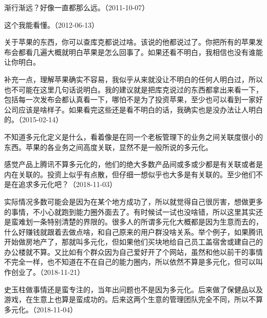 渐行渐远？好像一直都那么远。（2011-10-07）


这个我能看懂。（2012-06-13）


关于苹果的东西，你可以查库克都说过啥。该说的他都说过了。你把所有的苹果发布会都看几遍大概就明白苹果是怎么回事了。如果还看不明白，我相信也没有谁能让你明白。

补充一点，理解苹果确实不容易，我似乎从来就没让不明白的任何人明白过，所以也不可能在这里几句话说明白。我的建议就是把库克说过的东西都拿出来看一下，包括每一次发布会都认真看一下，哪怕不是为了投资苹果，至少也可以看到一家好公司应该是啥样子。如果看完这些还是看不明白的话，我确实也是没办法让人明白的。（2015-02-14）


不知道多元化定义是什么，看着像是在同一个老板管理下的业务之间关联度很小的东西。苹果的各业务之间高度关联，显然不是一般所说的多元化。


感觉产品上腾讯不算多元化的，他们的绝大多数产品间或多或少都是有关联或者是内在关联的。投资上似乎有点散，但仔细一想似乎也大多是有关联的。至少他们不是在追求多元化吧？（2018-11-03）


实际情况多数可能会是因为在某个地方成功了，所以就觉得自己很厉害，想做更多的事情，不小心就跑到能力圈外面去了。有时候试一试也没啥错，所以这里其实还是蛮难划一条特别清楚的界限的。很多人的所谓多元化大概都是因为生意而去的，什么好赚钱就跟着去做点啥，和自己原来的用户群没啥关系。举个例子，如果腾讯开始做房地产了，那就叫多元化，但如果他们买块地给自己员工盖宿舍或建自己的办公楼就不算。又比如有个群众因为自己爱好开了个网站，虽然和他以前干的事情不完全一样，也不知道在不在自己的能力圈内，所以依然不算是多元化，但可以叫作创业了。（2018-11-21）


史玉柱做事情还是蛮专注的，当年出问题也不是因为多元化。后来做了保健品以及游戏，在生意上也算是蛮成功的。后来这两个生意的管理团队完全不同，所以不算多元化。（2018-11-04）

